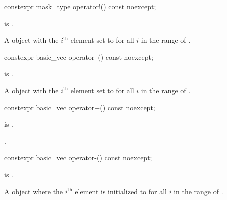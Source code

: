 \begin{itemdecl}
constexpr mask_type operator!() const noexcept;
\end{itemdecl}

\begin{itemdescr}
\pnum
\constraints
{} is .

\pnum
\returns
A  object with the $i^\text{th}$ element set to
 for all $i$ in the range of .
\end{itemdescr}

\begin{itemdecl}
constexpr basic_vec operator~() const noexcept;
\end{itemdecl}

\begin{itemdescr}
\pnum
\constraints
{} is .

\pnum
\returns
A  object with the $i^\text{th}$ element set to
 for all $i$ in the range of .
\end{itemdescr}

\begin{itemdecl}
constexpr basic_vec operator+() const noexcept;
\end{itemdecl}

\begin{itemdescr}
\pnum
\constraints
{} is .

\pnum
\returns
{}.
\end{itemdescr}

\begin{itemdecl}
constexpr basic_vec operator-() const noexcept;
\end{itemdecl}

\begin{itemdescr}
\pnum
\constraints
{} is .

\pnum
\returns
A  object where the $i^\text{th}$ element is initialized to
 for all $i$ in the range of .
\end{itemdescr}


